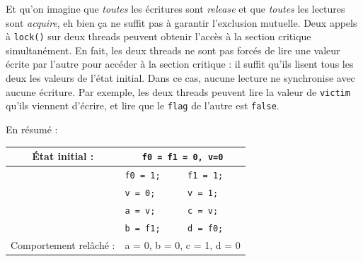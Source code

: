 Et qu'on imagine que \emph{toutes} les écritures sont \emph{release} et que
\emph{toutes} les lectures sont \emph{acquire}, eh bien ça ne suffit pas à
garantir l'exclusion mutuelle. Deux appels à \texttt{lock()} sur deux threads
peuvent obtenir l'accès à la section critique simultanément. En fait, les deux
threads ne sont pas forcés de lire une valeur écrite par l'autre pour accéder à
la section critique : il suffit qu'ils lisent tous les deux les valeurs de
l'état initial. Dans ce cas, aucune lecture ne synchronise avec aucune
écriture. Par exemple, les deux threads peuvent lire la valeur de
\texttt{victim} qu'ils viennent d'écrire, et lire que le \texttt{flag} de
l'autre est \texttt{false}.

En résumé :
\begin{center}
\begin{tabular}{|c|p{2.5cm}||p{2.5cm}|}
  \hline
  État initial : & \multicolumn{2}{c|}{\tt f0 = f1 = 0, v=0} \\
  \hline
                 & \tt f0 = 1; & \tt f1 = 1; \\
                 & \tt v = 0;  & \tt v = 1; \\
                 & \tt a = v;  & \tt c = v; \\
                 & \tt b = f1; & \tt d = f0; \\

  \hline
  Comportement relâché : & \multicolumn{2}{c|}{a = 0, b = 0, c = 1, d = 0} \\
  \hline
\end{tabular}
\end{center}

